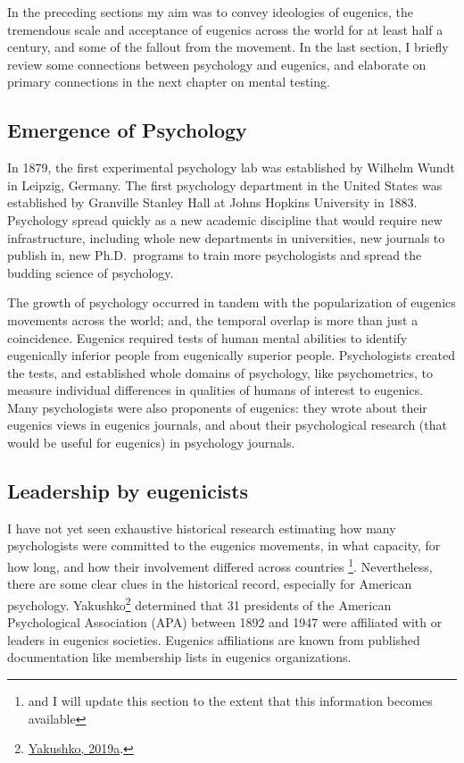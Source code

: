 \documentclass[
  oneside,
  12pt]{crumpbook}
\begin{document}
In the preceding sections my aim was to convey ideologies of eugenics, the tremendous scale and acceptance of eugenics across the world for at least half a century, and some of the fallout from the movement. In the last section, I briefly review some connections between psychology and eugenics, and elaborate on primary connections in the next chapter on mental testing.

\hypertarget{emergence-of-psychology}{%
\subsection{Emergence of Psychology}\label{emergence-of-psychology}}

In 1879, the first experimental psychology lab was established by Wilhelm Wundt in Leipzig, Germany. The first psychology department in the United States was established by Granville Stanley Hall at Johns Hopkins University in 1883. Psychology spread quickly as a new academic discipline that would require new infrastructure, including whole new departments in universities, new journals to publish in, new Ph.D.~programs to train more psychologists and spread the budding science of psychology.

The growth of psychology occurred in tandem with the popularization of eugenics movements across the world; and, the temporal overlap is more than just a coincidence. Eugenics required tests of human mental abilities to identify eugenically inferior people from eugenically superior people. Psychologists created the tests, and established whole domains of psychology, like psychometrics, to measure individual differences in qualities of humans of interest to eugenics. Many psychologists were also proponents of eugenics: they wrote about their eugenics views in eugenics journals, and about their psychological research (that would be useful for eugenics) in psychology journals.

\hypertarget{leadership-by-eugenicists}{%
\subsection{Leadership by eugenicists}\label{leadership-by-eugenicists}}

I have not yet seen exhaustive historical research estimating how many psychologists were committed to the eugenics movements, in what capacity, for how long, and how their involvement differed across countries \footnote{and I will update this section to the extent that this information becomes available}. Nevertheless, there are some clear clues in the historical record, especially for American psychology. Yakushko\footnote{\protect\hyperlink{ref-yakushkoEugenicsItsEvolution2019}{Yakushko, 2019a}.} determined that 31 presidents of the American Psychological Association (APA) between 1892 and 1947 were affiliated with or leaders in eugenics societies. Eugenics affiliations are known from published documentation like membership lists in eugenics organizations.
\end{document}
